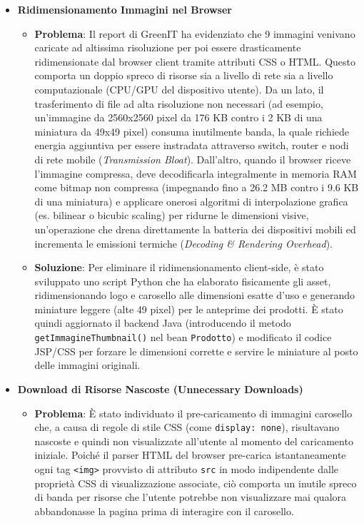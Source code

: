 \begin{itemize}
    \item \textbf{Ridimensionamento Immagini nel Browser}
    \begin{itemize}
        \item \textbf{Problema}: Il report di GreenIT ha evidenziato che 9 immagini venivano caricate ad altissima risoluzione per poi essere drasticamente ridimensionate dal browser client tramite attributi CSS o HTML. Questo comporta un doppio spreco di risorse sia a livello di rete sia a livello computazionale (CPU/GPU del dispositivo utente). Da un lato, il trasferimento di file ad alta risoluzione non necessari (ad esempio, un'immagine da 2560x2560 pixel da 176 KB contro i 2 KB di una miniatura da 49x49 pixel) consuma inutilmente banda, la quale richiede energia aggiuntiva per essere instradata attraverso switch, router e nodi di rete mobile (\textit{Transmission Bloat}). Dall'altro, quando il browser riceve l'immagine compressa, deve decodificarla integralmente in memoria RAM come bitmap non compressa (impegnando fino a 26.2 MB contro i 9.6 KB di una miniatura) e applicare onerosi algoritmi di interpolazione grafica (es. bilinear o bicubic scaling) per ridurne le dimensioni visive, un'operazione che drena direttamente la batteria dei dispositivi mobili ed incrementa le emissioni termiche (\textit{Decoding \& Rendering Overhead}).
        \item \textbf{Soluzione}: Per eliminare il ridimensionamento client-side, è stato sviluppato uno script Python che ha elaborato fisicamente gli asset, ridimensionando logo e carosello alle dimensioni esatte d'uso e generando miniature leggere (alte 49 pixel) per le anteprime dei prodotti. È stato quindi aggiornato il backend Java (introducendo il metodo \texttt{getImmagineThumbnail()} nel bean \texttt{Prodotto}) e modificato il codice JSP/CSS per forzare le dimensioni corrette e servire le miniature al posto delle immagini originali.
    \end{itemize}
    \item \textbf{Download di Risorse Nascoste (Unnecessary Downloads)}
    \begin{itemize}
        \item \textbf{Problema}: È stato individuato il pre-caricamento di immagini carosello che, a causa di regole di stile CSS (come \texttt{display: none}), risultavano nascoste e quindi non visualizzate all'utente al momento del caricamento iniziale. Poiché il parser HTML del browser pre-carica istantaneamente ogni tag \texttt{<img>} provvisto di attributo \texttt{src} in modo indipendente dalle proprietà CSS di visualizzazione associate, ciò comporta un inutile spreco di banda per risorse che l'utente potrebbe non visualizzare mai qualora abbandonasse la pagina prima di interagire con il carosello.

\end{itemize}
\end{itemize}
